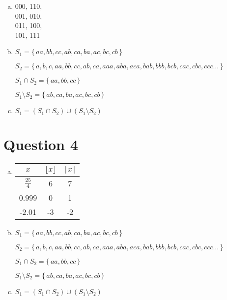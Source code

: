 \documentclass[12pt]{article}
\begin{document}
\begin{enumerate}[a)]
    \item
        000, 110,\\
        001, 010,\\
        011, 100,\\
        101, 111

    \bigskip

    \item
        $S_1 = \{\,aa,bb,cc,ab,ca,ba,ac,bc,cb\,\}$

        $S_2 = \{\,a,b,c,aa,bb,cc,ab,ca,aaa,aba,aca,bab,bbb,bcb,cac,cbc,ccc\dots\,\}$

        \bigskip

        $S_1 \cap S_2 = \{\,aa,bb,cc\,\}$

        $S_1 \setminus S_2 = \{\,ab,ca,ba,ac,bc,cb\,\}$

    \bigskip

    \item
        $S_1 = (S_1 \cap S_2) \cup (S_1 \setminus S_2)$
\end{enumerate}


\section*{Question 4}

\begin{enumerate}[a)]
    \item
        \begin{tabular}{ c | c | c }
            $x$ & $\lfloor x \rfloor$ & $\lceil x \rceil$ \\
            \hline
            $\frac{25}{4}$ & 6 & 7 \\
            \hline
            0.999 & 0 & 1 \\
            \hline
            -2.01 & -3 & -2 \\
            \hline
        \end{tabular}


    \bigskip

    \item
        $S_1 = \{\,aa,bb,cc,ab,ca,ba,ac,bc,cb\,\}$

        $S_2 = \{\,a,b,c,aa,bb,cc,ab,ca,aaa,aba,aca,bab,bbb,bcb,cac,cbc,ccc\dots\,\}$

        \bigskip

        $S_1 \cap S_2 = \{\,aa,bb,cc\,\}$

        $S_1 \setminus S_2 = \{\,ab,ca,ba,ac,bc,cb\,\}$

    \bigskip

    \item
        $S_1 = (S_1 \cap S_2) \cup (S_1 \setminus S_2)$
\end{enumerate}
\end{document}
